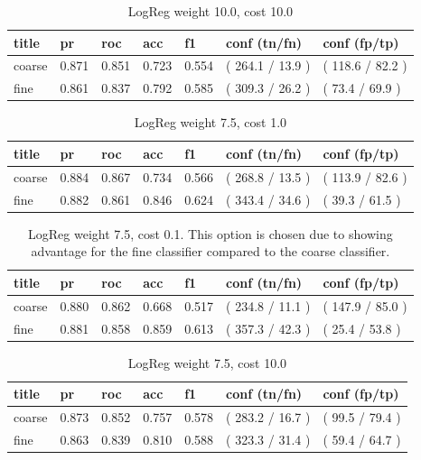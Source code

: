 \documentclass[ms]{nuthesis}
\begin{document}
\FloatBarrier
\begin{table}[H]
\centering
\begin{tabular}{|l||l||l||l||l||l||l|}\toprule
title & pr & roc & acc & f1 & conf (tn/fn) & conf (fp/tp) \\ \midrule
coarse & 0.871 & 0.851 & 0.723 & 0.554 & ( 264.1 / 13.9 ) & ( 118.6 / 82.2 ) \\
fine & 0.861 & 0.837 & 0.792 & 0.585 & ( 309.3 / 26.2 ) & ( 73.4 / 69.9 ) \\ \bottomrule
\end{tabular}
\caption{LogReg weight 10.0, cost 10.0}
\label{tab:LogRegWt10-C10}
\end{table}
\FloatBarrier

\FloatBarrier
\begin{table}[H]
\centering
\begin{tabular}{|l||l||l||l||l||l||l|}\toprule
title & pr & roc & acc & f1 & conf (tn/fn) & conf (fp/tp) \\ \midrule
coarse & 0.884 & 0.867 & 0.734 & 0.566 & ( 268.8 / 13.5 ) & ( 113.9 / 82.6 ) \\
fine & 0.882 & 0.861 & 0.846 & 0.624 & ( 343.4 / 34.6 ) & ( 39.3 / 61.5 ) \\ \bottomrule
\end{tabular}
\caption{LogReg weight 7.5, cost 1.0}
\label{tab:LogRegWt7p5-C1}
\end{table}
\FloatBarrier

\FloatBarrier
\begin{table}[H]
\centering
\begin{tabular}{|l||l||l||l||l||l||l|}\toprule
title & pr & roc & acc & f1 & conf (tn/fn) & conf (fp/tp) \\ \midrule
coarse & 0.880 & 0.862 & 0.668 & 0.517 & ( 234.8 / 11.1 ) & ( 147.9 / 85.0 ) \\
fine & 0.881 & 0.858 & 0.859 & 0.613 & ( 357.3 / 42.3 ) & ( 25.4 / 53.8 ) \\ \bottomrule
\end{tabular}
\caption{LogReg weight 7.5, cost 0.1. This option is chosen due to showing advantage for the
fine classifier compared to the coarse classifier.}
\label{tab:LogRegWt7p5-Cp1}
\end{table}
\FloatBarrier

\FloatBarrier
\begin{table}[H]
\centering
\begin{tabular}{|l||l||l||l||l||l||l|}\toprule
title & pr & roc & acc & f1 & conf (tn/fn) & conf (fp/tp) \\ \midrule
coarse & 0.873 & 0.852 & 0.757 & 0.578 & ( 283.2 / 16.7 ) & ( 99.5 / 79.4 ) \\
fine & 0.863 & 0.839 & 0.810 & 0.588 & ( 323.3 / 31.4 ) & ( 59.4 / 64.7 ) \\ \bottomrule
\end{tabular}
\caption{LogReg weight 7.5, cost 10.0}
\label{tab:LogRegWt7p5-C10}
\end{table}
\FloatBarrier
\end{document}
